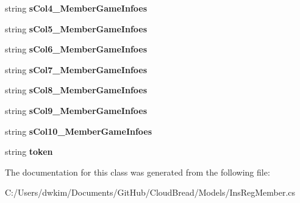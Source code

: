 \begin{DoxyCompactItemize}
\item 
string {\bfseries s\+Col4\+\_\+\+Member\+Game\+Infoes}\hypertarget{a00077_a551f03ab5510fbb72a1f1636ca7a8dcf}{}\label{a00077_a551f03ab5510fbb72a1f1636ca7a8dcf}

\item 
string {\bfseries s\+Col5\+\_\+\+Member\+Game\+Infoes}\hypertarget{a00077_a8834e42f16d30d15e1b3a58746545617}{}\label{a00077_a8834e42f16d30d15e1b3a58746545617}

\item 
string {\bfseries s\+Col6\+\_\+\+Member\+Game\+Infoes}\hypertarget{a00077_ac0be4060c7f46e06ef9901cb8e4d0ba2}{}\label{a00077_ac0be4060c7f46e06ef9901cb8e4d0ba2}

\item 
string {\bfseries s\+Col7\+\_\+\+Member\+Game\+Infoes}\hypertarget{a00077_af2903c208d9fab8ba2c4c0a20f32dc67}{}\label{a00077_af2903c208d9fab8ba2c4c0a20f32dc67}

\item 
string {\bfseries s\+Col8\+\_\+\+Member\+Game\+Infoes}\hypertarget{a00077_a6305d38f8e74be27aa341a287d53cfab}{}\label{a00077_a6305d38f8e74be27aa341a287d53cfab}

\item 
string {\bfseries s\+Col9\+\_\+\+Member\+Game\+Infoes}\hypertarget{a00077_aa465cdd63b990c461ae6499a86f71dbb}{}\label{a00077_aa465cdd63b990c461ae6499a86f71dbb}

\item 
string {\bfseries s\+Col10\+\_\+\+Member\+Game\+Infoes}\hypertarget{a00077_a0b9ce31226c80dd7fdb6376ea808cde2}{}\label{a00077_a0b9ce31226c80dd7fdb6376ea808cde2}

\item 
string {\bfseries token}\hypertarget{a00077_a5db51e4d5b1a57e4cd30f8b7886dca14}{}\label{a00077_a5db51e4d5b1a57e4cd30f8b7886dca14}

\end{DoxyCompactItemize}


The documentation for this class was generated from the following file\+:\begin{DoxyCompactItemize}
\item 
C\+:/\+Users/dwkim/\+Documents/\+Git\+Hub/\+Cloud\+Bread/\+Models/Ins\+Reg\+Member.\+cs\end{DoxyCompactItemize}
